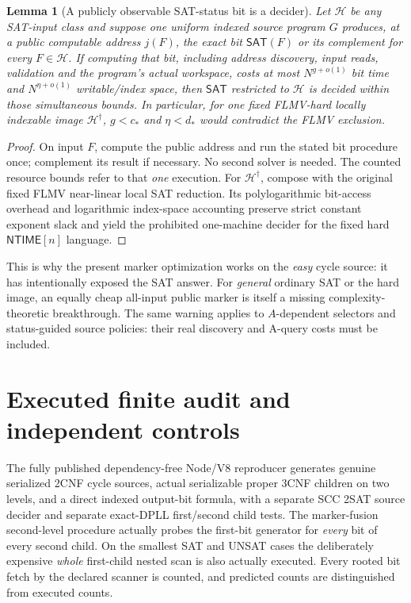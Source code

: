 \documentclass[11pt]{article}
\newtheorem{lemma}[theorem]{Lemma}
\newcommand{\SAT}{\mathsf{SAT}}
\newcommand{\NTIME}{\mathsf{NTIME}}
\begin{document}
\begin{lemma}[A publicly observable SAT-status bit is a decider]
Let \(\mathcal H\) be any SAT-input class and
suppose one \emph{uniform} indexed source
program \(G\) produces, at a public computable
address \(j(F)\), the exact bit
\(\SAT(F)\) or its complement for
\emph{every} \(F\in\mathcal H\).
If computing that bit, \emph{including} address
discovery, input reads, validation and the
program's actual workspace, costs at most
\(N^{g+o(1)}\) bit time and \(N^{\eta+o(1)}\)
writable/index space, then \(\SAT\) restricted
to \(\mathcal H\) is decided within those
\emph{simultaneous} bounds.
In particular, for one fixed FLMV-hard
locally indexable image \(\mathcal H^\dagger\),
\(g<c_*\) and \(\eta<d_*\) would contradict
the FLMV exclusion.
\end{lemma}
\begin{proof}
On input \(F\), compute the public address
and run the stated bit procedure once;
complement its result if necessary.
No second solver is needed. The counted
resource bounds refer to that \emph{one}
execution. For \(\mathcal H^\dagger\),
compose with the original fixed FLMV
near-linear local SAT reduction. Its
polylogarithmic bit-access overhead and
logarithmic index-space accounting preserve
strict constant exponent slack and yield
the prohibited one-machine decider for the
fixed hard \(\NTIME[n]\) language.
\end{proof}
This is why the present marker optimization
works on the \emph{easy} cycle source: it
has intentionally exposed the SAT answer.
For \emph{general} ordinary SAT or the
hard image, an equally cheap all-input
public marker is itself a missing
complexity-theoretic breakthrough.
The same warning applies to \(A\)-dependent
selectors and status-guided source policies:
their real discovery and A-query costs
must be included.

\section{Executed finite audit and independent controls}
The fully published dependency-free Node/V8
reproducer generates genuine serialized 2CNF
cycle sources, actual serializable proper
3CNF children on two levels, and a direct
indexed output-bit formula, with a separate
SCC 2SAT source decider and separate
exact-DPLL first/second child tests. The
marker-fusion second-level procedure
actually probes the first-bit generator
for \emph{every} bit of every second child.
On the smallest SAT and UNSAT cases the
deliberately expensive \emph{whole}
first-child nested scan is also actually
executed. Every rooted bit fetch by the
declared scanner is counted, and predicted
counts are distinguished from executed
counts.
\end{document}
